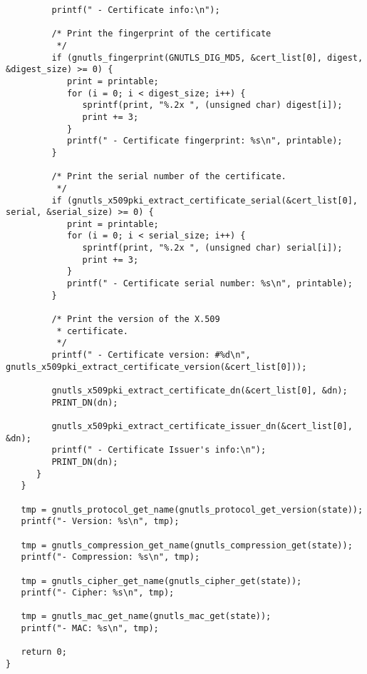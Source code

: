 \begin{verbatim}
         printf(" - Certificate info:\n");

         /* Print the fingerprint of the certificate
          */
         if (gnutls_fingerprint(GNUTLS_DIG_MD5, &cert_list[0], digest, &digest_size) >= 0) {
            print = printable;
            for (i = 0; i < digest_size; i++) {
               sprintf(print, "%.2x ", (unsigned char) digest[i]);
               print += 3;
            }
            printf(" - Certificate fingerprint: %s\n", printable);
         }

         /* Print the serial number of the certificate.
          */
         if (gnutls_x509pki_extract_certificate_serial(&cert_list[0], serial, &serial_size) >= 0) {
            print = printable;
            for (i = 0; i < serial_size; i++) {
               sprintf(print, "%.2x ", (unsigned char) serial[i]);
               print += 3;
            }
            printf(" - Certificate serial number: %s\n", printable);
         }

         /* Print the version of the X.509 
          * certificate.
          */
         printf(" - Certificate version: #%d\n", gnutls_x509pki_extract_certificate_version(&cert_list[0]));

         gnutls_x509pki_extract_certificate_dn(&cert_list[0], &dn);
         PRINT_DN(dn);

         gnutls_x509pki_extract_certificate_issuer_dn(&cert_list[0], &dn);
         printf(" - Certificate Issuer's info:\n");
         PRINT_DN(dn);
      }
   }

   tmp = gnutls_protocol_get_name(gnutls_protocol_get_version(state));
   printf("- Version: %s\n", tmp);

   tmp = gnutls_compression_get_name(gnutls_compression_get(state));
   printf("- Compression: %s\n", tmp);

   tmp = gnutls_cipher_get_name(gnutls_cipher_get(state));
   printf("- Cipher: %s\n", tmp);

   tmp = gnutls_mac_get_name(gnutls_mac_get(state));
   printf("- MAC: %s\n", tmp);

   return 0;
}

\end{verbatim}
